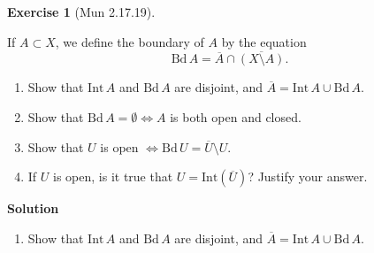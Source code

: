 \documentclass[
]{book}
\providecommand{\tightlist}{%
  \setlength{\itemsep}{0pt}\setlength{\parskip}{0pt}}
\theoremstyle{definition}
\theoremstyle{definition}
\theoremstyle{definition}
\newtheorem{exercise}{Exercise}[chapter]
\theoremstyle{definition}
\theoremstyle{remark}
\begin{document}
\begin{exercise}[Mun 2.17.19]
\protect\hypertarget{exr:unnamed-chunk-171}{}\label{exr:unnamed-chunk-171}

If \(A \subset X\), we define the boundary of \(A\) by the equation
\[\text{Bd} \, A = \overline{A} \cap \overline{(X \setminus A)}.\]

\begin{enumerate}
\def\labelenumi{(\alph{enumi})}
\tightlist
\item
  Show that \(\text{Int} \, A\) and \(\text{Bd} \, A\) are disjoint, and \(\overline{A} = \text{Int} \, A \cup \text{Bd} \, A\).
\item
  Show that \(\text{Bd} \, A = \emptyset \Leftrightarrow A\) is both open and closed.
\item
  Show that \(U\) is open \(\Leftrightarrow \text{Bd} \, U = \overline{U} \setminus U\).
\item
  If \(U\) is open, is it true that \(U = \text{Int}(\overline{U})\)? Justify your answer.
\end{enumerate}

\end{exercise}

\textbf{Solution}

\begin{enumerate}
\def\labelenumi{(\alph{enumi})}
\tightlist
\item
  Show that \(\text{Int} \, A\) and \(\text{Bd} \, A\) are disjoint, and \(\overline{A} = \text{Int} \, A \cup \text{Bd} \, A\).
\end{enumerate}
\end{document}
